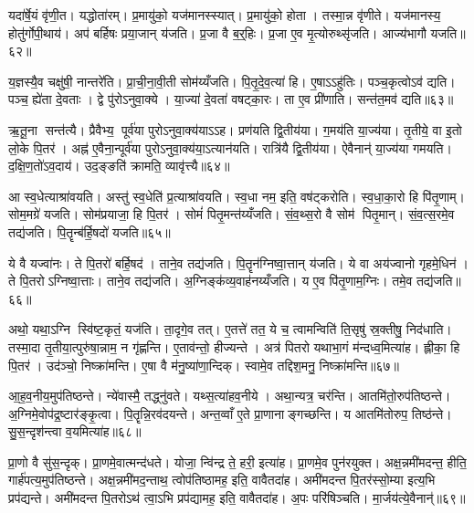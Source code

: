 यदा॑र्\mbox{}षे॒यं वृ॑णी॒त। यद्धोता॑रम्। प्र॒मायु॑को॒ यज॑मानस्स्यात्। प्र॒मायु॑को॒ होता। तस्मा॒न्न वृ॑णीते। यज॑मानस्य॒ होतु॑र्गोपी॒थाय॑। अप॑ बर्\mbox{}हिषः प्रया॒जान् य॑जति। प्र॒जा वै ब॒र्॒हिः। प्र॒जा ए॒व मृ॒त्योरुथ्सृ॑जति। आज्य॑भागौ यजति॥६२॥

य॒ज्ञस्यै॒व चक्षु॑षी॒ नान्तरे॑ति। प्रा॒ची॒ना॒वी॒ती सोम॑य्यँजति। पि॒तृ॒दे॒व॒त्या॑ हि। ए॒षाऽऽहु॑तिः। पञ्च॒कृत्वोऽव॑ द्यति। पञ्च॒ ह्ये॑ता दे॒वताः। द्वे पु॑रोऽनुवा॒क्ये। या॒ज्या॑ दे॒वता॑ वषट्का॒रः। ता ए॒व प्री॑णाति। सन्त॑त॒मव॑ द्यति॥६३॥

ऋ॒तू॒ना सन्त॑त्यै। प्रैवैभ्य॒ पूर्व॑या पुरोऽनुवा॒क्य॑याऽऽह। प्रण॑यति द्वि॒तीय॑या। ग॒मय॑ति या॒ज्य॑या। तृ॒तीये॒ वा इ॒तो लो॒के पि॒तर॑। अह्न॑ ए॒वैना॒न्पूर्व॑या पुरोऽनुवा॒क्य॑या॒ऽत्यान॑यति। रात्रि॑यै द्वि॒तीय॑या। ऐवैनान्॑ या॒ज्य॑या गमयति। द॒क्षि॒ण॒तो॑ऽव॒दाय॑। उद॒ङ्ङति॑ क्रामति॒ व्यावृ॑त्त्यै॥६४॥

आ स्व॒धेत्याश्रा॑वयति। अस्तु॑ स्व॒धेति॑ प्र॒त्याश्रा॑वयति। स्व॒धा नम॒ इति॒ वष॑ट्करोति। स्व॒धा॒का॒रो हि पि॑तृ॒णाम्। सोम॒मग्रे॑ यजति। सोम॑प्रयाजा॒ हि पि॒तर॑। सोमं॑ पितृ॒मन्त॑य्यँजति। सं॒व॒थ्स॒रो वै सोम॑ पितृ॒मान्। सं॒व॒त्स॒रमे॒व तद्य॑जति। पि॒तॄन्ब॑र्\mbox{}हि॒षदो॑ यजति॥६५॥

ये वै यज्वा॑नः। ते पि॒तरो॑ बर्\mbox{}हि॒षद॑। ताने॒व तद्य॑जति। पि॒तॄन॑ग्निष्वा॒त्तान् य॑जति। ये वा अय॑ज्वानो गृहमे॒धिन॑। ते पि॒तरोऽग्निष्वा॒त्ताः। ताने॒व तद्य॑जति। अ॒ग्निङ्क॑व्य॒वाह॑नय्यँजति। य ए॒व पि॑तृ॒णाम॒ग्निः। तमे॒व तद्य॑जति॥६६॥

अथो॒ यथा॒ऽग्नि स्वि॑ष्ट॒कृतं॒ यज॑ति। ता॒दृगे॒व तत्। ए॒तत्ते॑ तत॒ ये च॒ त्वामन्विति॑ ति॒सृषु॑ स्र॒क्तीषु॒ निद॑धाति। तस्मा॒दा तृ॒तीया॒त्पुरु॑षा॒न्नाम॒ न गृ॑ह्णन्ति। ए॒ताव॑न्तो॒ हीज्यन्ते। अत्र॑ पितरो यथाभा॒गं म॑न्दध्व॒मित्या॑ह। ह्लीका॒ हि पि॒तर॑। उद॑ञ्चो॒ निष्क्रा॑मन्ति। ए॒षा वै म॑नु॒ष्या॑णा॒न्दिक्। स्वामे॒व तद्दिश॒मनु॒ निष्क्रा॑मन्ति॥६७॥

आ॒ह॒व॒नीय॒मुप॑तिष्ठन्ते। न्ये॑वास्मै॒ तद्ध्नु॑वते। यथ्स॒त्या॑हव॒नीये। अथा॒न्यत्र॒ चर॑न्ति। आतमि॑तो॒रुप॑तिष्ठन्ते। अ॒ग्निमे॒वोप॑द्र॒ष्टार॑ङ्कृ॒त्वा। पि॒तॄन्नि॒रव॑दयन्ते। अन्त॒व्वाँ ए॒ते प्रा॒णानाङ्गच्छन्ति। य आतमि॑तोरुप॒ तिष्ठ॑न्ते। सु॒स॒न्दृश॑न्त्वा व॒यमित्या॑ह॥६८॥

प्रा॒णो वै सु॑स॒न्दृक्। प्रा॒णमे॒वात्मन्द॑धते। योजा॒ न्वि॑न्द्र ते॒ हरी॒ इत्या॑ह। प्रा॒णमे॒व पुन॑रयुक्त। अक्ष॒न्नमी॑मदन्त॒ हीति॒ गार्\mbox{}ह॑पत्य॒मुप॑तिष्ठन्ते। अक्ष॒न्नमी॑मद॒न्ताथ॒ त्वोप॑तिष्ठामह॒ इति॒ वावैतदा॑ह। अमी॑मदन्त पि॒तर॑स्सो॒म्या इत्य॒भि प्रप॑द्यन्ते। अमी॑मदन्त पि॒तरोऽथ॑ त्वा॒ऽभि प्रप॑द्यामह॒ इति॒ वावैतदा॑ह। अ॒पः परि॑षिञ्चति। मा॒र्जय॑त्ये॒वैनान्॑॥६९॥

